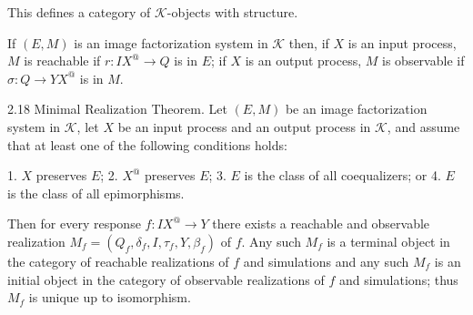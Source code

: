 This defines a category of $\mathcal{K}$-objects with structure.

If $(E, M)$ is an image factorization system in $\mathcal{K}$ then, if $X$ is an input process, $M$ is reachable if $r: IX^@ \longrightarrow Q$ is in $E$; if $X$ is an output process, $M$ is observable if $\sigma: Q \longrightarrow YX^@$ is in $M$.

2.18 Minimal Realization Theorem. Let $(E, M)$ be an image factorization system in $\mathcal{K}$, let $X$ be an input process and an output process in $\mathcal{K}$, and assume that at least one of the following conditions holds:

1. $X$ preserves $E$;
2. $X^@$ preserves $E$;
3. $E$ is the class of all coequalizers; or
4. $E$ is the class of all epimorphisms.

Then for every response $f: IX^@ \longrightarrow Y$ there exists a reachable and observable realization $M_f = (Q_f, \delta_f, I, \tau_f, Y, \beta_f)$ of $f$. Any such $M_f$ is a terminal object in the category of reachable realizations of $f$ and simulations and any such $M_f$ is an initial object in the category of observable realizations of $f$ and simulations; thus $M_f$ is unique up to isomorphism.